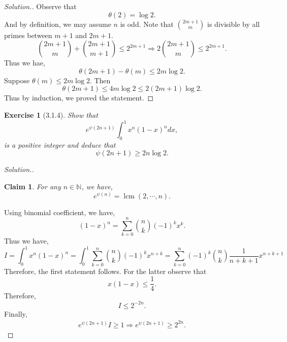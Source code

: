 \documentclass{article}
\newtheorem{exercise}{Exercise}[section]
\newtheorem{claim}{Claim}
\DeclareMathOperator{\lcm}{lcm}
\newcommand{\N}[0]{\mathbb{N}}
\begin{document}
\begin{proof}[Solution.]
  Observe that 
  \begin{equation*}
    \theta(2) = \log2.
  \end{equation*}
  And by definition, we may assume $n$ is odd. Note that ${2m+1\choose m}$ is divisible by all primes between $m+1$ and $2m+1$.
  \begin{equation*}
    {2m+1\choose m}+{2m+1\choose m+1}\leq 2^{2m+1}\Rightarrow 2{2m+1\choose m}\leq 2^{2m+1}.
  \end{equation*}
  Thus we hae,
  \begin{equation*}
    \theta(2m+1)-\theta(m)\leq 2m\log2.
  \end{equation*}
  Suppose $\theta(m)\leq 2m\log 2$. Then 
  \begin{equation*}
    \theta(2m+1)\leq 4m\log2\leq 2(2m+1)\log2.
  \end{equation*}
  Thus by induction, we proved the statement.
\end{proof}
\setcounter{claim}{0}
\begin{exercise}[3.1.4]
  Show that 
  \begin{equation*}
    e^{\psi(2n+1)}\int_0^1 x^n(1-x)^ndx,
  \end{equation*}
  is a positive integer and deduce that
  \begin{equation*}
    \psi(2n+1)\geq2n\log 2.
  \end{equation*}
\end{exercise}
\begin{proof}[Solution.]
  \begin{claim}
    For any $n\in\N$, we have,
    \begin{equation*}
      e^{\psi(n)} = \lcm(2,\cdots,n).
    \end{equation*}
  \end{claim}
  Using binomial coefficient, we have,
  \begin{equation*}
    (1-x)^n = \sum_{k=0}^n {n\choose k}(-1)^{k}x^{k}.
  \end{equation*}
  Thus we have,
  \begin{equation*}
    I=\int_0^1 x^n(1-x)^n = \int_0^1\sum_{k=0}^n {n\choose k}(-1)^{k}x^{n+k} = \sum_{k=0}^n (-1)^k{n\choose k}{\frac 1 {n+k+1}}x^{n+k+1}
  \end{equation*}
  Therefore, the first statement follows. For the latter observe that 
  \begin{equation*}
    x(1-x)\leq {\frac 1 4}.
  \end{equation*}
  Therefore,
  \begin{equation*}
    I\leq 2^{-2n}.
  \end{equation*}
  Finally,
  \begin{align*}
    e^{\psi(2n+1)}I\geq1 \Rightarrow e^{\psi(2n+1)}\geq 2^{2n}.
  \end{align*}
\end{proof}
\end{document}
